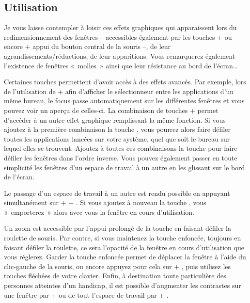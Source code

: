 \subsection{Utilisation}
Je vous laisse contempler à loisir ces effets graphiques qui apparaissent lors du redimensionnement des fenêtres -- accessibles également par les touches  +  ou encore  + appui du bouton central de la souris --, de leur agrandissements/réductions, de leur apparitions. Vous remarquerez également l'existence de fenêtres «~molles~» ainsi que leur résistance au bord de l'écran\ldots{}\par
Certaines touches permettent d'avoir accès à des effets avancés. Par exemple, lors de l'utilisation de  +  afin d'afficher le sélectionneur entre les applications d'un même bureau, le focus passe automatiquement sur les différentes fenêtres et vous pouvez voir un aperçu de celles-ci. La combinaison de touches  +  permet d'accéder à un autre effet graphique remplissant la même fonction. Si vous ajoutez à la première combinaison la touche , vous pourrez alors faire défiler toutes les applications lancées sur votre système, quel que soit le bureau sur lequel elles se trouvent. Ajoutez à toutes ces combinaisons la touche  pour faire défiler les fenêtres dans l'ordre inverse. Vous pouvez également passer en toute simplicité les fenêtres d'un espace de travail à un autre en les glissant sur le bord de l'écran.\par
Le passage d'un espace de travail à un autre est rendu possible en appuyant simultanément sur  +  + . Si vous ajoutez à nouveau la touche , vous «~emporterez~» alors avec vous la fenêtre en cours d'utilisation.\par
Un zoom est accessible par l'appui prolongé de la touche  en faisant défiler la roulette de souris. Par contre, si vous maintenez la touche  enfoncée, toujours en faisant défiler la roulette, ce sera l'opacité de la fenêtre en cours d'utilisation que vous réglerez. Garder la touche  enfoncée permet de déplacer la fenêtre à l'aide du clic-gauche de la souris, ou encore appuyez pour cela sur  + , puis utilisez les touches fléchées de votre clavier. Enfin, à destination toute particulière des personnes atteintes d'un handicap, il est possible d'augmenter les contrastes sur une fenêtre par  +  ou de tout l'espace de travail par  + .\par
